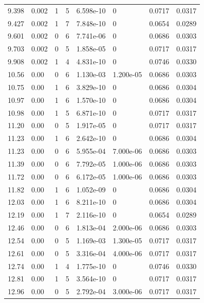 \documentclass[preview]{standalone}
\begin{document}
{{{\begin{tabular}{L{1.2cm}C{1.2cm} C{0.3cm}C{0.5cm} C{1.4cm}C{1.4cm} C{1.4cm}C{1.4cm}}
  9.398  &  0.002  & 1     &  5 &  6.598e-10  & 0  & 0.0717 &  0.0317   \\ 
  9.427  &  0.002  & 1     &  7 &  7.848e-10  & 0  & 0.0654 &  0.0289   \\ 
  9.601  &  0.002  & 0     &  6 &  7.741e-06  & 0  & 0.0686 &  0.0303   \\ 
  9.703  &  0.002  & 0     &  5 &  1.858e-05  & 0  & 0.0717 &  0.0317   \\ 
  9.908  &  0.002  & 1     &  4 &  4.831e-10  & 0  & 0.0746 &  0.0330   \\ 
  10.56  &  0.00  & 0     &  6 &  1.130e-03  & 1.200e-05  & 0.0686 &  0.0303   \\ 
  10.75  &  0.00  & 1     &  6 &  3.829e-10  & 0  & 0.0686 &  0.0304   \\ 
  10.97  &  0.00  & 1     &  6 &  1.570e-10  & 0  & 0.0686 &  0.0304   \\ 
  10.98  &  0.00  & 1     &  5 &  6.871e-10  & 0  & 0.0717 &  0.0317   \\ 
  11.20  &  0.00  & 0     &  5 &  1.917e-05  & 0  & 0.0717 &  0.0317   \\ 
  11.23  &  0.00  & 1     &  6 &  2.642e-10  & 0  & 0.0686 &  0.0304   \\ 
  11.23  &  0.00  & 0     &  6 &  5.955e-04  & 7.000e-06  & 0.0686 &  0.0303   \\ 
  11.39  &  0.00  & 0     &  6 &  7.792e-05  & 1.000e-06  & 0.0686 &  0.0303   \\ 
  11.72  &  0.00  & 0     &  6 &  6.172e-05  & 1.000e-06  & 0.0686 &  0.0303   \\ 
  11.82  &  0.00  & 1     &  6 &  1.052e-09  & 0  & 0.0686 &  0.0304   \\ 
  12.03  &  0.00  & 1     &  6 &  8.211e-10  & 0  & 0.0686 &  0.0304   \\ 
  12.19  &  0.00  & 1     &  7 &  2.116e-10  & 0  & 0.0654 &  0.0289   \\ 
  12.46  &  0.00  & 0     &  6 &  1.813e-04  & 2.000e-06  & 0.0686 &  0.0303   \\ 
  12.54  &  0.00  & 0     &  5 &  1.169e-03  & 1.300e-05  & 0.0717 &  0.0317   \\ 
  12.61  &  0.00  & 0     &  5 &  3.316e-04  & 4.000e-06  & 0.0717 &  0.0317   \\ 
  12.74  &  0.00  & 1     &  4 &  1.775e-10  & 0  & 0.0746 &  0.0330   \\ 
  12.81  &  0.00  & 1     &  5 &  3.564e-10  & 0  & 0.0717 &  0.0317   \\ 
  12.96  &  0.00  & 0     &  5 &  2.792e-04  & 3.000e-06  & 0.0717 &  0.0317   \\ 

\end{tabular}}}}
\end{document}
